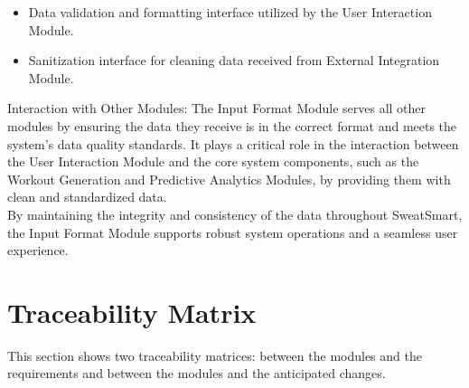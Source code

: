 \documentclass[12pt, titlepage]{article}
\begin{document}
\begin{description}[leftmargin=0pt]
\item[Interfaces:]
\end{description}
\begin{itemize}[leftmargin=*]
\item Data validation and formatting interface utilized by the User Interaction Module.
\item Sanitization interface for cleaning data received from External Integration Module.
\end{itemize}

Interaction with Other Modules: The Input Format Module serves all other modules by ensuring the data they receive is in the correct format and meets the system's data quality standards. It plays a critical role in the interaction between the User Interaction Module and the core system components, such as the Workout Generation and Predictive Analytics Modules, by providing them with clean and standardized data.
\\

By maintaining the integrity and consistency of the data throughout SweatSmart, the Input Format Module supports robust system operations and a seamless user experience.



\section{Traceability Matrix} \label{SecTM}

This section shows two traceability matrices: between the modules and the
requirements and between the modules and the anticipated changes.
\end{document}
